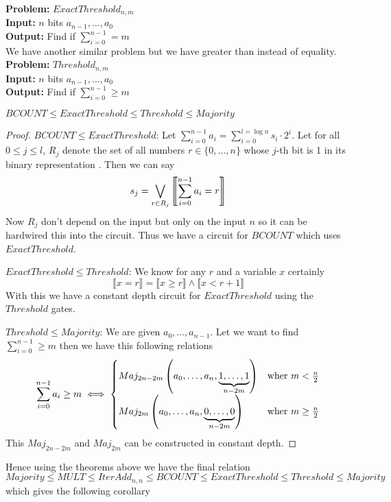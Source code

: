 \textbf{Problem:} $ExactThreshold_{n,m}$\\
\textbf{Input:} $n$ bits $a_{n-1},\dots, a_0$\\
\textbf{Output:} Find if $\sum_{i=0}^{n-1}= m$\\[2mm]
We have another similar problem but we have greater than instead of equality.\\[2mm]
\textbf{Problem:} $Threshold_{n,m}$\\
\textbf{Input:} $n$ bits $a_{n-1},\dots, a_0$\\
\textbf{Output:} Find if $\sum_{i=0}^{n-1}\geq m$\\

\begin{theorem}\label{bcthmajrel}
	$BCOUNT\leq ExactThreshold\leq Threshold\leq Majority$
\end{theorem}

\begin{proof}
	\underline{$BCOUNT\leq ExactThreshold$}: Let $\sum_{i=0}^{n-1}a_i=\sum_{i=0}^{l=\log n}s_i\cdot 2^i$. Let for all $0\leq j\leq l$, $R_j$ denote the set of all numbers $r\in \{0,\dots,n\}$ whose $j$-th bit is 1 in its binary representation . Then we can say $$s_j=\bigvee_{r\in R_j}\left\llbracket \sum_{i=0}^{n-1}a_i=r\right\rrbracket$$Now $R_j$ don't depend on the input but only on the input $n$ so it can be hardwired this into the circuit. Thus we have a circuit for $BCOUNT$ which uses $ExactThreshold$.
	
	\underline{$ExactThreshold\leq Threshold$}: We know for any $r$ and a variable $x$ certainly $$\llbracket x=r\rrbracket= \llbracket x\geq r\rrbracket \wedge  \llbracket x< r+1\rrbracket$$With this we have a constant depth circuit for $ExactThreshold$ using the $Threshold$ gates.
	
	\underline{$Threshold\leq Majority$}: We are given $a_0,\dots,a_{n-1}$. Let we want to find $\sum_{i=0}^{n-1}\geq m$ then we have this following relations $$\sum_{i=0}^{n-1}a_i\geq m\iff \begin{cases}
		Maj_{2n-2m}\left(a_0,\dots, a_n,\underbrace{1,\dots,1}_{n-2m}\right) & \text{wher $m<\frac{n}{2}$}\\
		Maj_{2m}\left(a_0,\dots, a_n,\underbrace{0,\dots,0}_{n-2m}\right) & \text{wher $m\geq\frac{n}{2}$}
	\end{cases}$$
	This $Maj_{2n-2m}$ and $Maj_{2m}$ can be constructed in constant depth.
\end{proof}

\begin{remark}
	Hence using the theorems above we have the final relation $$Majority\leq MULT\leq IterAdd_{n,n}\leq BCOUNT\leq ExactThreshold\leq Threshold\leq Majority$$ which gives the following corollary
\end{remark}

